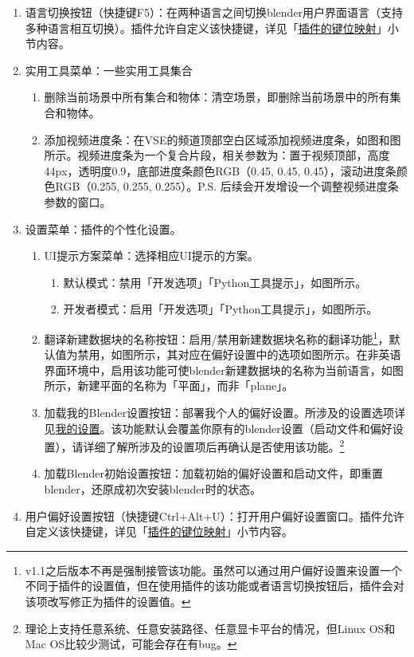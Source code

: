 \documentclass{../../public_resources/doc}
\begin{document}

\begin{enumerate}
    \item 语言切换按钮（快捷键F5）：在两种语言之间切换blender用户界面语言（支持多种语言相互切换）。插件允许自定义该快捷键，详见「\hyperlink{AddonKeymaps}{插件的键位映射}」小节内容。
    \item 实用工具菜单：一些实用工具集合
    \begin{enumerate}
        \item 删除当前场景中所有集合和物体：清空场景，即删除当前场景中的所有集合和物体。
        \item 添加视频进度条：在VSE的频道顶部空白区域添加视频进度条，如图和图所示。视频进度条为一个复合片段，相关参数为：置于视频顶部，高度44px，透明度0.9，底部进度条颜色RGB（0.45, 0.45, 0.45），滚动进度条颜色RGB（0.255, 0.255, 0.255）。P.S. 后续会开发增设一个调整视频进度条参数的窗口。
    \end{enumerate}
    \item 设置菜单：插件的个性化设置。
    \begin{enumerate}
        \item UI提示方案菜单：选择相应UI提示的方案。
        \begin{enumerate}
            \item 默认模式：禁用「开发选项」「Python工具提示」，如图所示。
            \item 开发者模式：启用「开发选项」「Python工具提示」，如图所示。
        \end{enumerate}
        \item 翻译新建数据块的名称按钮：启用/禁用新建数据块名称的翻译功能\footnote{v1.1之后版本不再是强制接管该功能。虽然可以通过用户偏好设置来设置一个不同于插件的设置值，但在使用插件的该功能或者语言切换按钮后，插件会对该项改写修正为插件的设置值。}，默认值为禁用，如图所示，其对应在偏好设置中的选项如图所示。在非英语界面环境中，启用该功能可使blender新建数据块的名称为当前语言，如图所示，新建平面的名称为「平面」，而非「plane」。
        \item 加载我的Blender设置按钮：部署我个人的偏好设置。所涉及的设置选项详见\hyperlink{MySettings}{我的设置}。该功能默认会覆盖你原有的blender设置（启动文件和偏好设置），请详细了解所涉及的设置项后再确认是否使用该功能。\footnote{理论上支持任意系统、任意安装路径、任意显卡平台的情况，但Linux OS和Mac OS比较少测试，可能会存在有bug。}
        \item 加载Blender初始设置按钮：加载初始的偏好设置和启动文件，即重置blender，还原成初次安装blender时的状态。
    \end{enumerate}
    \item 用户偏好设置按钮（快捷键Ctrl+Alt+U）：打开用户偏好设置窗口。插件允许自定义该快捷键，详见「\hyperlink{AddonKeymaps}{插件的键位映射}」小节内容。
\end{enumerate}
\end{document}
